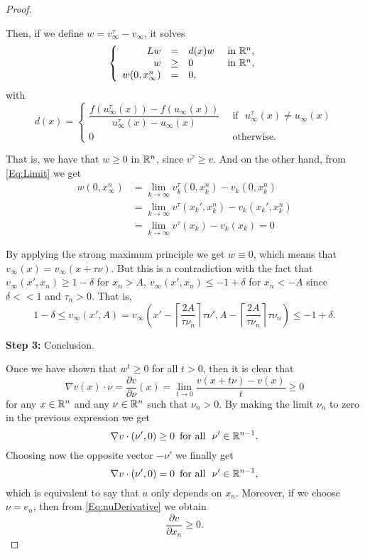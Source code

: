 \begin{proof}
\begin{itemize}
Then, if we define $w= v_\infty^\tau - v_\infty$, it solves
$$
\left\{\begin{array}{rcll}
L w &=& d(x) w  &\textrm{ in }\mathbb{R}^n,\\
w &\geq& 0  &\textrm{ in }\mathbb{R}^n,\\
w(0, x_\infty^n ) &=& 0,
\end{array} \right.
$$
with 
$$ d(x) = \begin{cases}
\dfrac{f(u_\infty^\tau(x))-f(u_\infty(x))}{u_\infty^\tau(x)-u_\infty(x)} \,\,\, &\text{if } \,\, u_\infty^\tau(x)\not=u_\infty(x)\\
0 \,\, & \text{otherwise}.
\end{cases} $$


That is, we have that $w\geq 0$ in $\mathbb{R}^n$, since $v^\tau \geq v$. And on the other hand, from \eqref{Eq:Limit} we get
\begin{align*}
w(0,x_\infty^n) &= \lim_{k\to\infty} v_k^\tau(0,x_k^n)- v_k(0,x_k^n) \\ 
&= \lim_{k\to\infty} v^\tau(x_k',x_k^n)- v_k(x_k',x_k^n) \\ 
&= \lim_{k\to\infty}  v^\tau(x_k)- v_k(x_k) = 0
\end{align*}

By applying the strong maximum principle we get $w\equiv 0$, which means that $v_\infty(x) = v_\infty(x+\tau\nu)$. But this is a contradiction with the fact that $v_\infty(x',x_n) \geq 1-\delta$ for $x_n>A$, $v_\infty(x',x_n) \leq -1+\delta$ for $x_n<-A$ since $\delta<<1$ and $\tau_n>0$. That is,
$$ 1-\delta \leq v_\infty(x',A) = v_\infty \left( x' - \left\lceil \frac{2A}{\tau\nu_n} \right\rceil \tau \nu', A - \left\lceil \frac{2A}{\tau\nu_n} \right\rceil \tau \nu_n\right) \leq -1+\delta. $$

\end{itemize}

\textbf{Step 3: }Conclusion.

Once we have shown that $w^t\geq 0$ for all $t>0$, then it is clear that
\begin{equation}
\label{Eq:nuDerivative}
\nabla v(x) \cdot \nu = \frac{\partial v}{\partial \nu} (x) = \lim_{t \to 0}  \dfrac{v(x+t\nu)-v(x)}{t} \geq 0
\end{equation}
for any $x\in \mathbb{R}^n$ and any $\nu\in \mathbb{R}^n$ such that $\nu_n>0$.
By making the limit $\nu_n$ to zero in the previous expression we get
$$ \nabla v \cdot (\nu',0) \geq 0 \,\,\, \text{for all } \,\, \nu'\in\mathbb{R}^{n-1}. $$
Choosing now the opposite vector $-\nu'$ we finally get
$$ \nabla v \cdot (\nu',0) = 0 \,\,\, \text{for all } \,\, \nu'\in\mathbb{R}^{n-1}, $$
which is equivalent to say that $u$ only depends on $x_n$. Moreover, if we choose $\nu = e_n$, then from \eqref{Eq:nuDerivative} we obtain
$$ \frac{\partial v}{\partial x_n} \geq 0. $$
\end{proof}






